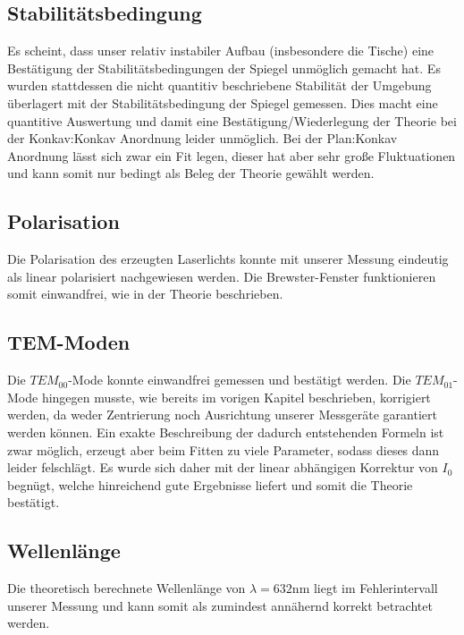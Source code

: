 \subsection{Stabilitätsbedingung}
Es scheint, dass unser relativ instabiler Aufbau (insbesondere die Tische) eine Bestätigung der Stabilitätsbedingungen der Spiegel unmöglich gemacht hat.
Es wurden stattdessen die nicht quantitiv beschriebene Stabilität der Umgebung überlagert mit der Stabilitätsbedingung der Spiegel gemessen.
Dies macht eine quantitive Auswertung und damit eine Bestätigung/Wiederlegung der Theorie bei der Konkav:Konkav Anordnung leider unmöglich.
Bei der Plan:Konkav Anordnung lässt sich zwar ein Fit legen, dieser hat aber sehr große Fluktuationen und kann somit nur bedingt als Beleg der Theorie gewählt werden.

\subsection{Polarisation}
Die Polarisation des erzeugten Laserlichts konnte mit unserer Messung eindeutig als linear polarisiert nachgewiesen werden.
Die Brewster-Fenster funktionieren somit einwandfrei, wie in der Theorie beschrieben.

\subsection{TEM-Moden}
Die $TEM_{00}$-Mode konnte einwandfrei gemessen und bestätigt werden.
Die $TEM_{01}$-Mode hingegen musste, wie bereits im vorigen Kapitel beschrieben, korrigiert werden, da weder Zentrierung noch Ausrichtung unserer Messgeräte garantiert werden können.
Ein exakte Beschreibung der dadurch entstehenden Formeln ist zwar möglich, erzeugt aber beim Fitten zu viele Parameter, sodass dieses dann leider felschlägt.
Es wurde sich daher mit der linear abhängigen Korrektur von $I_0$ begnügt, welche hinreichend gute Ergebnisse liefert und somit die Theorie bestätigt.

\subsection{Wellenlänge}
Die theoretisch berechnete Wellenlänge von $\lambda=632\si{\nano\meter} $ liegt im Fehlerintervall unserer Messung und kann somit als zumindest annähernd korrekt betrachtet werden.

